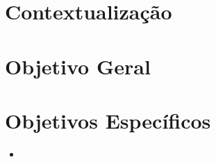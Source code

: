 \section{Contextualização}

\section{Objetivo Geral}

\section{Objetivos Específicos}

\begin{itemize}
\item 
\end{itemize}